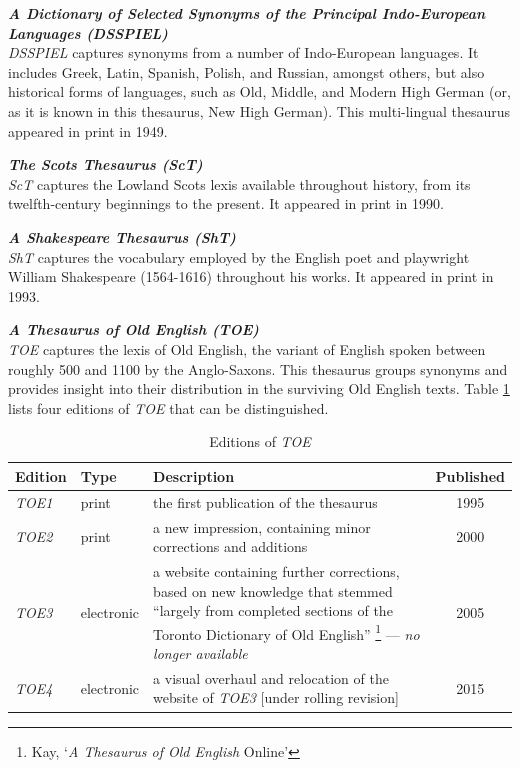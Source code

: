 \bigskip
\noindent
\textbf{\textit{A Dictionary of Selected Synonyms of the Principal Indo-European Languages (DSSPIEL)}}\\
\textit{DSSPIEL} captures synonyms from a number of Indo-European languages. It includes Greek, Latin, Spanish, Polish, and Russian, amongst others, but also historical forms of languages, such as Old, Middle, and Modern High German (or, as it is known in this thesaurus, New High German). This multi-lingual thesaurus appeared in print in 1949. 

\bigskip
\noindent
\textbf{\textit{The Scots Thesaurus (ScT)}}\\
\textit{ScT} captures the Lowland Scots lexis available throughout history, from its twelfth-century beginnings to the present. 
It appeared in print in 1990.

\bigskip
\noindent
\textbf{\textit{A Shakespeare Thesaurus (ShT)}}\\
\textit{ShT} captures the vocabulary employed by the English poet and playwright William Shakespeare (1564-1616) throughout his works. 
It appeared in print in 1993.

\bigskip
\noindent
\textbf{\textit{A Thesaurus of Old English (TOE)}}\\
\textit{TOE} captures the lexis of Old English, the variant of English spoken between roughly 500 and 1100 by the Anglo-Saxons. This thesaurus groups synonyms and provides insight into their distribution in the surviving Old English texts. Table \ref{table:Stolk_thes-content:editions-TOE} lists four editions of \textit{TOE} that can be distinguished.

\begin{table}[h!]
    \centering
    \small
    \begin{tabular}{llp{2.8in}c}
    \toprule
        \textbf{Edition} & \textbf{Type} & \textbf{Description} & \textbf{Published} \\ 
    \midrule
    \textit{TOE1} & print & the first publication of the thesaurus & 1995 \\
    \textit{TOE2} & print & a new impression, containing minor corrections and additions & 2000 \\
    \textit{TOE3} & electronic & a website containing further corrections, based on new knowledge that stemmed ``largely from completed sections of the Toronto Dictionary of Old English'' \footnote{Kay, `\textit{A Thesaurus of Old English} Online'%
    } --- \textit{no longer available} & 2005 \\
    \textit{TOE4} & electronic & a visual overhaul and relocation of the website of \textit{TOE3} [under rolling revision] & 2015 \\
    \midrule
    \end{tabular}
    \caption[]{\label{table:Stolk_thes-content:editions-TOE}Editions of \textit{TOE}}
\end{table}

